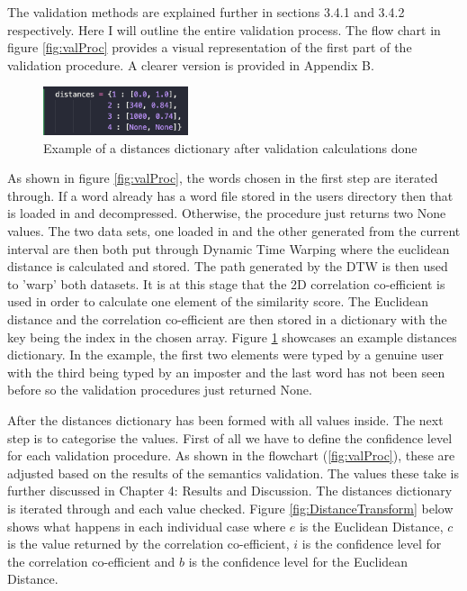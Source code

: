 \documentclass[10pt,a4paper]{report}
\begin{document}
The validation methods are explained further in sections 3.4.1 and 3.4.2 respectively. Here I will outline the entire validation process. The flow chart in figure \ref{fig:valProc} provides a visual representation of the first part of the validation procedure. A clearer version is provided in Appendix B.

\begin{figure}
	\begin{center}
		\includegraphics[width=0.38\textwidth]{DistancesDict}
	\end{center}
	\caption{Example of a distances dictionary after validation calculations done}
	\label{fig:distances}
\end{figure}


As shown in figure \ref{fig:valProc}, the words chosen in the first step are iterated through. If a word already has a word file stored in the users directory then that is loaded in and decompressed. Otherwise, the procedure just returns two None values. The two data sets, one loaded in and the other generated from the current interval are then both put through Dynamic Time Warping where the euclidean distance is calculated and stored. The path generated by the DTW is then used to 'warp' both datasets. It is at this stage that the 2D correlation co-efficient is used in order to calculate one element of the similarity score. The Euclidean distance and the correlation co-efficient are then stored in a dictionary with the key being the index in the chosen array. Figure \ref{fig:distances} showcases an example distances dictionary. In the example, the first two elements were typed by a genuine user with the third being typed by an imposter and the last word has not been seen before so the validation procedures just returned None.

After the distances dictionary has been formed with all values inside. The next step is to categorise the values. First of all we have to define the confidence level for each validation procedure. As shown in the flowchart (\ref{fig:valProc}), these are adjusted based on the results of the semantics validation. The values these take is further discussed in Chapter 4: Results and Discussion. The distances dictionary is iterated through and each value checked. Figure \ref{fig:DistanceTransform} below shows what happens in each individual case where \(e\) is the Euclidean Distance, \(c\) is the value returned by the correlation co-efficient, \(i\) is the confidence level for the correlation co-efficient and \(b\) is the confidence level for the Euclidean Distance.
\end{document}
